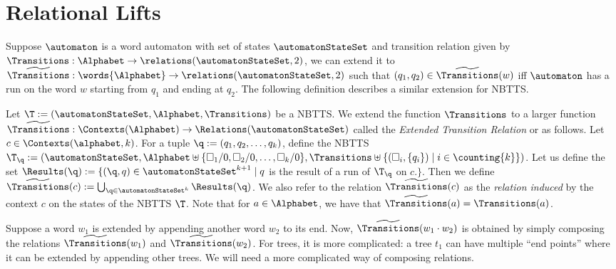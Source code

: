 \section{Relational Lifts}\label{sec:relationalLifts}

Suppose $\automaton$ is a word automaton with set of states $\automatonStateSet$ and transition relation given by $\Transitions: \Alphabet \to \relations(\automatonStateSet, 2)$, we can extend it to $\widetilde{\Transitions}: \words{\Alphabet} \to \relations(\automatonStateSet, 2)$ such that $(q_1,q_2) \in \widetilde{\Transitions}(w)$ iff $\automaton$ has a run on the word $w$ starting from $q_1$ and ending at $q_2$. The following definition describes a similar extension for NBTTS.

\begin{definition}\label{def:extendedTransitionRelation}
    Let $\T := (\automatonStateSet, \Alphabet, \Transitions)$ be a NBTTS. We extend the function $\Transitions$ to a larger function $\widetilde{\Transitions} : \Contexts(\Alphabet) \to \Relations(\automatonStateSet)$ called the \emph{Extended Transition Relation} or \emph{\extendedTransitionRelation} as follows. Let $c \in \Contexts(\alphabet, k)$. For a tuple $\q := (q_1, q_2, \dots, q_k)$, define the NBTTS $\T_{\q} := (\automatonStateSet, \Alphabet\uplus\{\square_1/0, \square_2/0, \dots, \square_k/0\}, \Transitions\uplus\{(\square_i, \{q_i\}) \mid i \in \counting{k} \})$. Let us define the set $\Results(\q) := \{(\q, q) \in \automatonStateSet^{k+1} \mid q$ is the result of a run of $\T_{\q}$ on $c.\}$. Then we define $\widetilde{\Transitions}(c) := \bigcup_{\q \in \automatonStateSet^k} \Results(\q)$. We also refer to the relation $\widetilde{\Transitions}(c)$ as the \emph{relation induced} by the context $c$ on the states of the NBTTS $\T$. Note that for $a \in \Alphabet$, we have that $\widetilde{\Transitions}(a) = \Transitions(a)$.
\end{definition}

Suppose a word $w_1$ is extended by appending another word $w_2$ to its end. Now, $\widetilde{\Transitions}(w_1 \cdot w_2)$ is obtained by simply composing the relations $\widetilde{\Transitions}(w_1)$ and $\widetilde{\Transitions}(w_2)$. For trees, it is more complicated: a tree $t_1$ can have multiple ``end points'' where it can be extended by appending other trees. We will need a more complicated way of composing relations.

